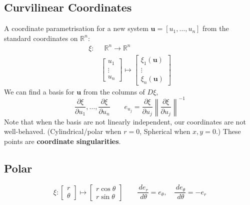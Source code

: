 \documentclass[a4paper, 11pt]{article}
\newcommand{\RR}{\mathbb{R}}
\def\pp#1#2{\frac{\partial #1}{\partial #2}}
\def\dd#1#2{\frac{\,d#1}{\,d#2}}
\def\norm#1{\left\|#1\right\|}
\begin{document}
\begin{multicols}{2}
	\section*{Curvilinear Coordinates}
	A coordinate parametrisation for a new system $\textbf{u}=[u_1,\dots,u_n]$ from the standard coordinates on $\RR^n$:
	\begin{align*}
		\xi : & \;\;\RR^n\longrightarrow \RR^n         \\
		      & \begin{bmatrix}
			        u_1    \\
			        \vdots \\
			        u_n
		        \end{bmatrix}\mapsto \begin{bmatrix}
			                             \xi_1(\textbf{u}) \\
			                             \vdots            \\
			                             \xi_n(\textbf{u})
		                             \end{bmatrix}
	\end{align*}
	We can find a basis for $\textbf{u}$ from the columns of $D\xi$,
	$$\pp\xi{u_1},\dots,\pp{\xi}{u_n}\qquad e_{u_j}= \pp{\xi}{u_j}\norm{\pp{\xi}{u_j}}^{-1}$$
	Note that when the basis are not linearly independent, our coordinates are not well-behaved. (Cylindrical/polar when $r=0$, Spherical when $x,y=0$.) These points are \textbf{coordinate singularities}.

	\subsection*{Polar}
	\[
		\xi: \begin{bmatrix}
			r \\
			\theta
		\end{bmatrix} \mapsto \begin{bmatrix}
			r\cos\theta \\
			r\sin\theta
		\end{bmatrix}
		\qquad
		\dd{e_r}{\theta}=e_\theta,\quad
		\dd{e_\theta}{\theta}=-e_r
	\]


\end{multicols}
\end{document}
